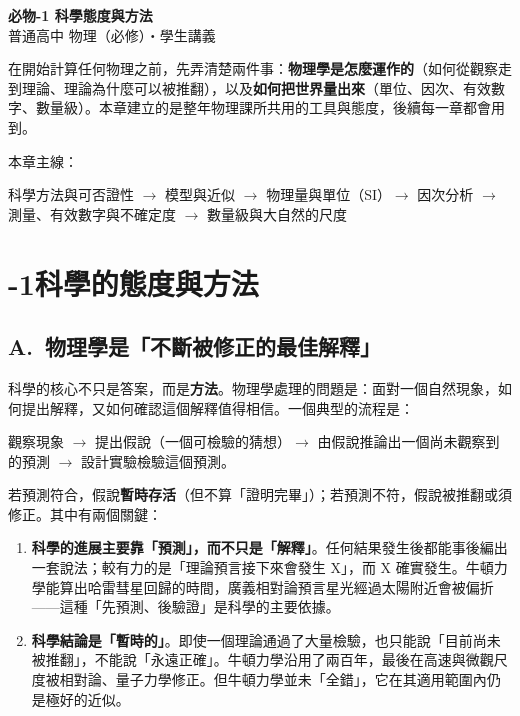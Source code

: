 \documentclass[11pt]{article}
\begin{document}
\begin{center}
{\sffamily\Huge\bfseries 必物-1 科學態度與方法}\\[3pt]
{\sffamily\large 普通高中 物理（必修）・學生講義}
\end{center}
\vspace{0.6em}

在開始計算任何物理之前，先弄清楚兩件事：\textbf{物理學是怎麼運作的}（如何從觀察走到理論、理論為什麼可以被推翻），以及\textbf{如何把世界量出來}（單位、因次、有效數字、數量級）。本章建立的是整年物理課所共用的工具與態度，後續每一章都會用到。

\medskip
本章主線：

\begin{center}
科學方法與可否證性 $\rightarrow$ 模型與近似 $\rightarrow$ 物理量與單位（SI）$\rightarrow$ 因次分析 $\rightarrow$ 測量、有效數字與不確定度 $\rightarrow$ 數量級與大自然的尺度
\end{center}

\section*{-1\quad 科學的態度與方法}

\subsection*{\sffamily A.\ 物理學是「不斷被修正的最佳解釋」}

科學的核心不只是答案，而是\textbf{方法}。物理學處理的問題是：面對一個自然現象，如何提出解釋，又如何確認這個解釋值得相信。一個典型的流程是：

\begin{center}
觀察現象 $\rightarrow$ 提出假說（一個可檢驗的猜想）$\rightarrow$ 由假說推論出一個尚未觀察到的預測 $\rightarrow$ 設計實驗檢驗這個預測。
\end{center}

若預測符合，假說\textbf{暫時存活}（但不算「證明完畢」）；若預測不符，假說被推翻或須修正。其中有兩個關鍵：

\begin{enumerate}\setlength{\itemsep}{2pt}
\item \textbf{科學的進展主要靠「預測」，而不只是「解釋」}。任何結果發生後都能事後編出一套說法；較有力的是「理論預言接下來會發生 X」，而 X 確實發生。牛頓力學能算出哈雷彗星回歸的時間，廣義相對論預言星光經過太陽附近會被偏折——這種「先預測、後驗證」是科學的主要依據。
\item \textbf{科學結論是「暫時的」}。即使一個理論通過了大量檢驗，也只能說「目前尚未被推翻」，不能說「永遠正確」。牛頓力學沿用了兩百年，最後在高速與微觀尺度被相對論、量子力學修正。但牛頓力學並未「全錯」，它在其適用範圍內仍是極好的近似。
\end{enumerate}
\end{document}
